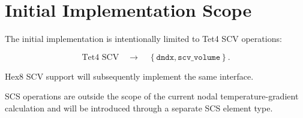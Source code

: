 \documentclass[11pt]{article}
\begin{document}
\section{Initial Implementation Scope}

The initial implementation is intentionally limited to Tet4 SCV
operations:

$$
\text{Tet4 SCV}
\quad\rightarrow\quad
\left\{
\texttt{dndx},
\texttt{scv\_volume}
\right\}.
$$

Hex8 SCV support will subsequently implement the same interface.

SCS operations are outside the scope of the current nodal
temperature-gradient calculation and will be introduced through a
separate SCS element type.
\end{document}
